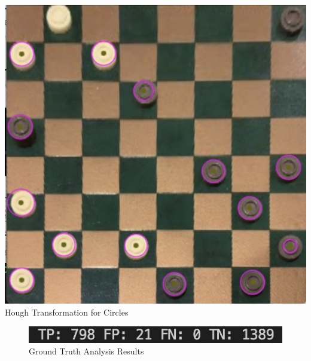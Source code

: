 \documentclass[11pt]{article}
\begin{document}
    \begin{center}
        \includegraphics[scale=0.35]{HoughCircles.png}
        \newline
        Hough Transformation for Circles
    \end{center}

    \newpage
    \begin{figure}
        \centering
        \includegraphics[scale=1]{AssignPt5Res.png}
        \caption{Ground Truth Analysis Results}
    \end{figure}
\end{document}
